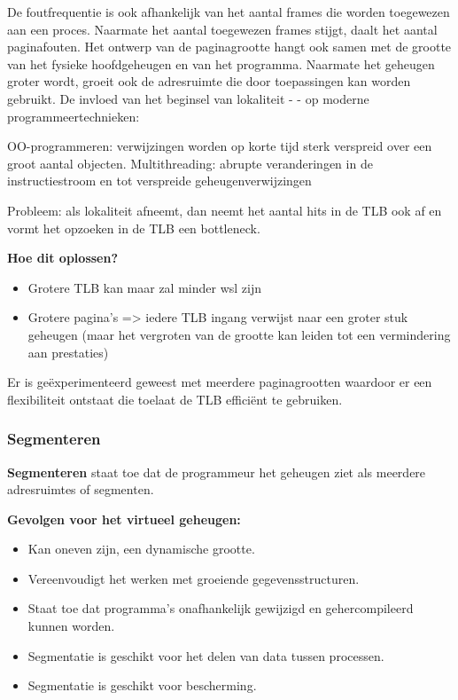 De foutfrequentie is ook afhankelijk van het aantal frames die worden toegewezen aan een proces. Naarmate het aantal toegewezen frames stijgt, daalt het aantal paginafouten. Het ontwerp van de paginagrootte hangt ook samen met de grootte van het fysieke hoofdgeheugen en van het programma. Naarmate het geheugen groter wordt, groeit ook de adresruimte die door toepassingen kan worden gebruikt. De invloed van het beginsel van lokaliteit - - op moderne programmeertechnieken:

OO-programmeren: verwijzingen worden op korte tijd sterk verspreid over een groot aantal objecten. Multithreading: abrupte veranderingen in de instructiestroom en tot verspreide geheugenverwijzingen

Probleem: als lokaliteit afneemt, dan neemt het aantal hits in de TLB ook af en vormt het opzoeken in de TLB een bottleneck.

\textbf{Hoe dit oplossen?}

\begin{itemize}
\item Grotere TLB kan maar zal minder wsl zijn
\item Grotere pagina's => iedere TLB ingang verwijst naar een groter stuk geheugen (maar het vergroten van de grootte kan leiden tot een vermindering aan prestaties)
\end{itemize}

Er is geëxperimenteerd geweest met meerdere paginagrootten waardoor er een flexibiliteit ontstaat die toelaat de TLB efficiënt te gebruiken.

\subsubsection{Segmenteren}

\textbf{Segmenteren} staat toe dat de programmeur het geheugen ziet als meerdere adresruimtes of segmenten.

\textbf{Gevolgen voor het virtueel geheugen:}

\begin{itemize}
\item Kan oneven zijn, een dynamische grootte.
\item Vereenvoudigt het werken met groeiende gegevensstructuren.
\item Staat toe dat programma’s onafhankelijk gewijzigd en gehercompileerd kunnen worden.
\item Segmentatie is geschikt voor het delen van data tussen processen.
\item Segmentatie is geschikt voor bescherming.
\end{itemize}

